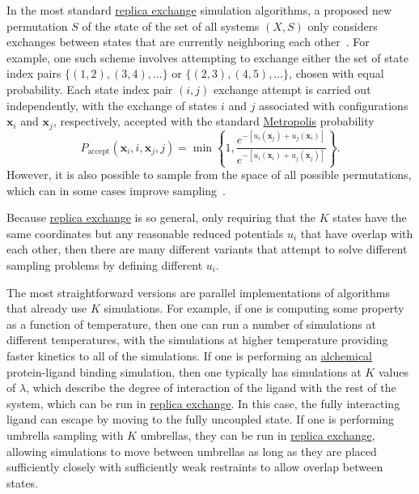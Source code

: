 \documentclass[9pt,review]{livecoms}
\newcommand{\vx}{\mathbf{x}}
\begin{document}
In the most standard \hyperlink{ref:ReplEx} {replica exchange} simulation algorithms, a proposed new permutation $S$ of the state of the set of all systems $(X,S)$  only considers exchanges between states that are currently neighboring each other~\cite{hukushima-nemoto:j-phys-soc-jpn:1996:parallel-tempering,hansmann:chem-phys-lett:1997:parallel-tempering-monte-carlo,sugita-okamoto:chem-phys-lett:1999:parallel-tempering-md,sugita-kitao-okamoto:jcp:2000:hamiltonian-exchange,fukunishi-watanabe-takada:jcp:2002:hamiltonian-exchange,jang-shin-pak:prl:2003:hamiltonian-exchange,kwak-hansmann:prl:2005:hamiltonian-exchange}.
For example, one such scheme involves attempting to exchange either the set of state index pairs $\{(1,2), (3,4), \ldots\}$ or $\{(2,3), (4,5), \ldots\}$, chosen with equal probability. Each state index pair $(i,j)$ exchange attempt is carried out independently, with the exchange of states $i$ and $j$ associated with configurations $\vx_i$ and $\vx_j$, respectively, accepted with the standard \hyperlink{ref:MetropolisMonteCarlo} {Metropolis} probability
\begin{equation}
P_\mathrm{accept}(\vx_i, i, \vx_j, j) = \min\left\{ 1, \frac{e^{-[u_i(\vx_j)+u_j(\vx_i)]}}{e^{-[u_i(\vx_i) + u_j(\vx_j)]}}\right\}.
\label{eq:re_exchange_prob}
\end{equation}
However, it is also possible to sample from the space of all possible permutations, which can in some cases improve sampling~\cite{shirts_gibbssamp}.

Because \hyperlink{ref:ReplEx} {replica exchange} is so general, only requiring that the $K$ states have the same coordinates but any reasonable reduced potentials $u_i$ that have overlap with each other, then there are many different variants that attempt to solve different sampling problems by defining different $u_i$.

The most straightforward versions are parallel implementations of algorithms that already use $K$ simulations. For example, if one is computing some property as a function of temperature, then one can run a number of simulations at different temperatures, with the simulations at higher temperature providing faster kinetics to all of the simulations. If one is performing an \hyperlink{ref:Alchemical} {alchemical} protein-ligand binding simulation, then one typically has simulations at $K$ values of $\lambda$, which describe the degree of interaction of the ligand with the rest of the system, which can be run in \hyperlink{ref:ReplEx} {replica exchange}. In this case, the fully interacting ligand can escape by moving to the fully uncoupled state. If one is performing umbrella sampling with $K$ umbrellas, they can be run in \hyperlink{ref:ReplEx} {replica exchange}, allowing simulations to move between umbrellas as long as they are placed sufficiently closely with sufficiently weak restraints to allow overlap between states.
\end{document}
